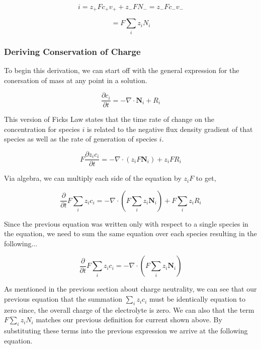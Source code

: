 \documentclass[lettersize,journal]{IEEEtran}
\begin{document}
\begin{equation}
  i = z_{+}Fc_{+}v_{+} + z_- FN_- = z_{-}Fc_{-}v_{-}
\end{equation}

\begin{equation}
  = F\sum_{i}z_{i}N_{i}
\end{equation}

\subsubsection{ Deriving Conservation of Charge }

To begin this derivation, we can start off with the general expression for the conersation of mass at any point in a solution.

\begin{equation}
  \frac{\partial c_{i}}{\partial t}=-\nabla \cdot \mathbf{N}_{i}+R_{i}
\end{equation}

This version of Ficks Law states that the time rate of change on the concentration for species $i$ is related to the negative flux density gradient of that species as well as the rate of generation of species $i$.

\begin{equation}
  F \frac{\partial z_{i} c_{i}}{\partial t}=-\nabla \cdot\left(z_{i} F \mathbf{N}_{i}\right)+z_{i} F R_{i}
\end{equation}

Via algebra, we can multiply each side of the equation by $z_{i}F$ to get,

\begin{equation}
  \frac{\partial}{\partial t} F \sum_{i} z_{i} c_{i}=-\nabla \cdot\left(F \sum_{i} z_{i} \mathbf{N}_{i}\right)+F \sum_{i} z_{i} R_{i}
\end{equation}

Since the previous equation was written only with respect to a single species in the equation, we need to sum the same equation over each species resulting in the following...

\begin{equation}
  \frac{\partial}{\partial t} F \sum_{i} z_{i} c_{i}=-\nabla \cdot\left(F \sum_{i} z_{i} \mathbf{N}_{i}\right)
\end{equation}

As mentioned in the previous section about charge neutrality, we can see that our previous equation that the summation $\sum_{i}z_{i}c_{i}$ must be identically equation to zero since, the overall charge of the electrolyte is zero. We can also that the term $F\sum_{i}z_{i}N_{i}$ matches our previous definition for current shown above. By substituting these terms into the previous expression we arrive at the following equation.
\end{document}
